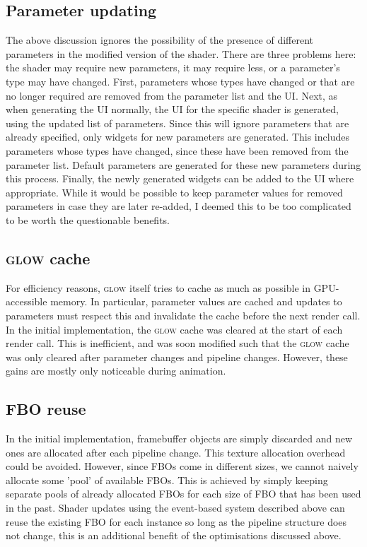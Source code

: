 \documentclass[12pt,twoside,notitlepage]{report}
\begin{document}
\subsection{Parameter updating}
The above discussion ignores the possibility of the presence of different parameters in the modified version of the shader. There are three problems here: the shader may require new parameters, it may require less, or a parameter's type may have changed. First, parameters whose types have changed or that are no longer required are removed from the parameter list and the UI. Next, as when generating the UI normally, the UI for the specific shader is generated, using the updated list of parameters. Since this will ignore parameters that are already specified, only widgets for new parameters are generated. This includes parameters whose types have changed, since these have been removed from the parameter list. Default parameters are generated for these new parameters during this process. Finally, the newly generated widgets can be added to the UI where appropriate. While it would be possible to keep parameter values for removed parameters in case they are later re-added, I deemed this to be too complicated to be worth the questionable benefits.

\subsection{\textsc{glow} cache}
\label{glow-cache}
For efficiency reasons, \textsc{glow} itself tries to cache as much as possible in GPU-accessible memory. In particular, parameter values are cached and updates to parameters must respect this and invalidate the cache before the next render call. In the initial implementation, the \textsc{glow} cache was cleared at the start of each render call. This is inefficient, and was soon modified such that the \textsc{glow} cache was only cleared after parameter changes and pipeline changes. However, these gains are mostly only noticeable during animation.

\subsection{FBO reuse}
In the initial implementation, framebuffer objects are simply discarded and new ones are allocated after each pipeline change. This texture allocation overhead could be avoided. However, since FBOs come in different sizes, we cannot naively allocate some 'pool' of available FBOs. This is achieved by simply keeping separate pools of already allocated FBOs for each size of FBO that has been used in the past. Shader updates using the event-based system described above can reuse the existing FBO for each instance so long as the pipeline structure does not change, this is an additional benefit of the optimisations discussed above.
\end{document}

